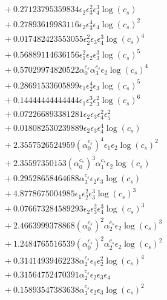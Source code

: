 \documentclass[10pt]{article}
\begin{document}
\begin{align*}
&{}  + 0.27123795359834 \epsilon_{2} \epsilon_{3}^{2} \epsilon_{4}^{3} \log{\left(c_{s} \right)} \\
&{}  + 0.27893619983116 \epsilon_{2} \epsilon_{3}^{4} \epsilon_{4} \log{\left(c_{s} \right)}^{2} \\
&{}  + 0.017482423553055 \epsilon_{2}^{2} \epsilon_{3} \epsilon_{4}^{3} \log{\left(c_{s} \right)}^{4} \\
&{}  + 0.56889114636156 \epsilon_{1}^{2} \epsilon_{2} \epsilon_{3}^{3} \log{\left(c_{s} \right)}^{5} \\
&{}  + 0.57029974820522 \alpha_{0}^{c_s} \alpha_{3}^{c_s} \epsilon_{2} \log{\left(c_{s} \right)}^{4} \\
&{}  + 0.28691533605899 \epsilon_{1} \epsilon_{2}^{4} \epsilon_{3} \log{\left(c_{s} \right)}^{5} \\
&{}  + 0.14444444444444 \epsilon_{1} \epsilon_{2}^{3} \epsilon_{3}^{2} \log{\left(c_{s} \right)}^{6} \\
&{}  + 0.072266893381281 \epsilon_{2} \epsilon_{3} \epsilon_{4}^{2} \epsilon_{5}^{2} \\
&{}  + 0.018082530239889 \epsilon_{2} \epsilon_{3} \epsilon_{4}^{4} \log{\left(c_{s} \right)} \\
&{}  + 2.3557526524959 \left(\alpha_{0}^{c_s}\right)^{4} \epsilon_{1} \epsilon_{2} \log{\left(c_{s} \right)}^{2} \\
&{}  + 2.35597350153 \left(\alpha_{0}^{c_s}\right)^{3} \alpha_{1}^{c_s} \epsilon_{2} \log{\left(c_{s} \right)} \\
&{}  + 0.29528658464688 \alpha_{3}^{c_s} \epsilon_{2} \epsilon_{3} \log{\left(c_{s} \right)} \\
&{}  + 4.8778675004985 \epsilon_{1} \epsilon_{2}^{2} \epsilon_{3}^{3} \log{\left(c_{s} \right)}^{3} \\
&{}  + 0.076673284589293 \epsilon_{2} \epsilon_{3}^{2} \epsilon_{4}^{3} \log{\left(c_{s} \right)}^{3} \\
&{}  + 2.4663999378868 \left(\alpha_{0}^{c_s}\right)^{2} \alpha_{2}^{c_s} \epsilon_{2} \log{\left(c_{s} \right)}^{3} \\
&{}  + 1.2484765516539 \left(\alpha_{0}^{c_s}\right)^{2} \alpha_{2}^{c_s} \epsilon_{2} \log{\left(c_{s} \right)}^{2} \\
&{}  + 0.31414939462238 \alpha_{2}^{c_s} \epsilon_{1} \epsilon_{2}^{2} \log{\left(c_{s} \right)}^{4} \\
&{}  + 0.31564752470391 \alpha_{2}^{c_s} \epsilon_{2} \epsilon_{3} \epsilon_{4} \\
&{}  + 0.15893547383638 \alpha_{3}^{c_s} \epsilon_{2} \epsilon_{3} \log{\left(c_{s} \right)}^{2} \\

\end{align*}
\end{document}
